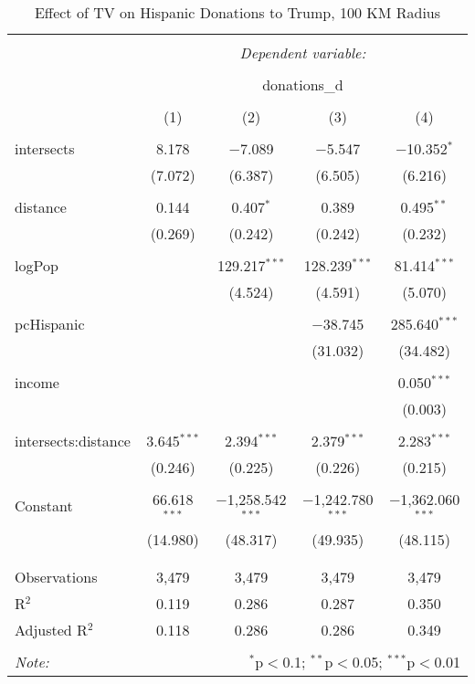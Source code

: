 
\begin{table}[!htbp] \centering 
  \caption{Effect of TV on Hispanic Donations to Trump, 100 KM Radius} 
  \label{} 
\begin{tabular}{@{\extracolsep{-5pt}}lcccc} 
\\[-1.8ex]\hline 
\hline \\[-1.8ex] 
 & \multicolumn{4}{c}{\textit{Dependent variable:}} \\ 
\cline{2-5} 
\\[-1.8ex] & \multicolumn{4}{c}{donations\_d} \\ 
\\[-1.8ex] & (1) & (2) & (3) & (4)\\ 
\hline \\[-1.8ex] 
 intersects & 8.178 & $-$7.089 & $-$5.547 & $-$10.352$^{*}$ \\ 
  & (7.072) & (6.387) & (6.505) & (6.216) \\ 
  & & & & \\ 
 distance & 0.144 & 0.407$^{*}$ & 0.389 & 0.495$^{**}$ \\ 
  & (0.269) & (0.242) & (0.242) & (0.232) \\ 
  & & & & \\ 
 logPop &  & 129.217$^{***}$ & 128.239$^{***}$ & 81.414$^{***}$ \\ 
  &  & (4.524) & (4.591) & (5.070) \\ 
  & & & & \\ 
 pcHispanic &  &  & $-$38.745 & 285.640$^{***}$ \\ 
  &  &  & (31.032) & (34.482) \\ 
  & & & & \\ 
 income &  &  &  & 0.050$^{***}$ \\ 
  &  &  &  & (0.003) \\ 
  & & & & \\ 
 intersects:distance & 3.645$^{***}$ & 2.394$^{***}$ & 2.379$^{***}$ & 2.283$^{***}$ \\ 
  & (0.246) & (0.225) & (0.226) & (0.215) \\ 
  & & & & \\ 
 Constant & 66.618$^{***}$ & $-$1,258.542$^{***}$ & $-$1,242.780$^{***}$ & $-$1,362.060$^{***}$ \\ 
  & (14.980) & (48.317) & (49.935) & (48.115) \\ 
  & & & & \\ 
\hline \\[-1.8ex] 
Observations & 3,479 & 3,479 & 3,479 & 3,479 \\ 
R$^{2}$ & 0.119 & 0.286 & 0.287 & 0.350 \\ 
Adjusted R$^{2}$ & 0.118 & 0.286 & 0.286 & 0.349 \\ 
\hline 
\hline \\[-1.8ex] 
\textit{Note:}  & \multicolumn{4}{r}{$^{*}$p$<$0.1; $^{**}$p$<$0.05; $^{***}$p$<$0.01} \\ 
\end{tabular} 
\end{table} 
